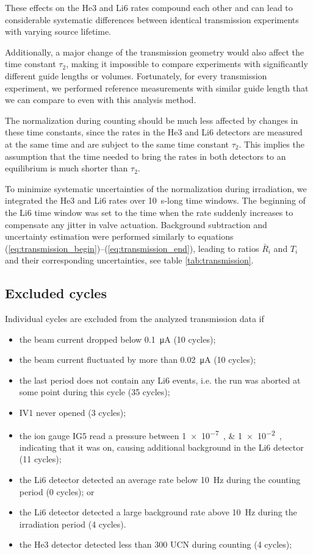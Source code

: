 \documentclass[10pt,letterpaper]{article}
\begin{document}
These effects on the He3 and Li6 rates compound each other and can lead to considerable systematic differences between identical transmission experiments with varying source lifetime.

Additionally, a major change of the transmission geometry would also affect the time constant $\tau_2$, making it impossible to compare experiments with significantly different guide lengths or volumes. Fortunately, for every transmission experiment, we performed reference measurements with similar guide length that we can compare to even with this analysis method.

The normalization during counting should be much less affected by changes in these time constants, since the rates in the He3 and Li6 detectors are measured at the same time and are subject to the same time constant $\tau_2$. This implies the assumption that the time needed to bring the rates in both detectors to an equilibrium is much shorter than $\tau_2$.

To minimize systematic uncertainties of the normalization during irradiation, we integrated the He3 and Li6 rates over \SI{10}{\second}-long time windows. The beginning of the Li6 time window was set to the time when the rate suddenly increases to compensate any jitter in valve actuation. Background subtraction and uncertainty estimation were performed similarly to equations (\ref{eq:transmission_begin})--(\ref{eq:transmission_end}), leading to ratios $\bar{R}_i$ and $T_i$ and their corresponding uncertainties, see table \ref{tab:transmission}.

\subsection{Excluded cycles}

Individual cycles are excluded from the analyzed transmission data if
\begin{itemize}
\item the beam current dropped below \SI{0.1}{\micro\ampere} (10 cycles);
\item the beam current fluctuated by more than \SI{0.02}{\micro\ampere} (10 cycles);
\item the last period does not contain any Li6 events, i.e. the run was aborted at some point during this cycle (35 cycles);
\item IV1 never opened (3 cycles);
\item the ion gauge IG5 read a pressure between \SIlist{1e-7;1e-2}{\torr}, indicating that it was on, causing additional background in the Li6 detector (11 cycles);
\item the Li6 detector detected an average rate below \SI{10}{\hertz} during the counting period (0 cycles); or
\item the Li6 detector detected a large background rate above \SI{10}{\hertz} during the irradiation period (4 cycles).
\item the He3 detector detected less than 300 UCN during counting (4 cycles);
\end{itemize}
\end{document}
